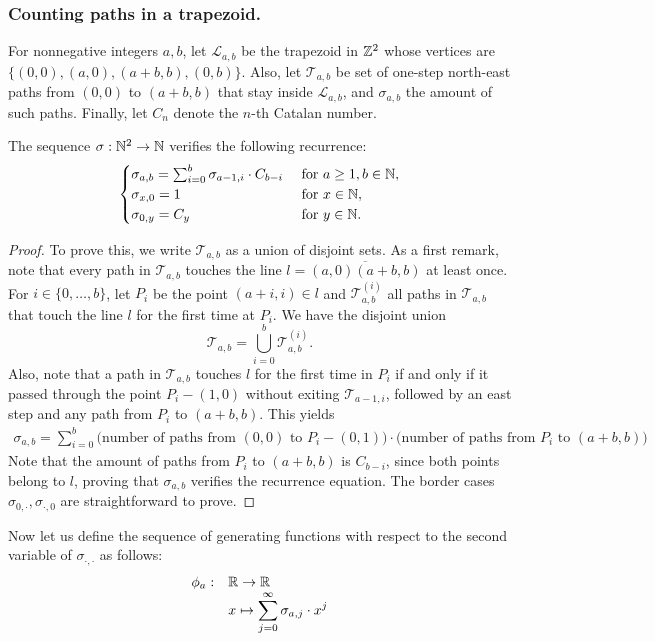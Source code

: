  \subsubsection{Counting paths in a trapezoid.} For nonnegative integers $a,b$, let $\mathcal L_{a,b}$ be the trapezoid in $\mathbb{Z}^2$ whose vertices are
 $\{(0,0),(a,0),(a+b,b),(0,b)\}.$ Also, let $\mathcal{T}_{a,b}$ be set of one-step north-east paths from $(0,0)$ to $(a+b,b)$ that stay inside $\mathcal L_{a,b}$, and  $\sigma_{a,b}$ the amount of such paths. Finally, let $C_n$ denote the $n$-th Catalan number. 
 \begin{myprop}
    \label{sigma-recurrence}
    The sequence $\sigma:\mathbb{N}^2\to \mathbb{N}$ verifies the following recurrence:
    $$\begin{cases}
    \sigma_{a,b}=\sum_{i=0}^b\sigma_{a-1,i}\cdot C_{b-i}& \mbox{ for }a\geq 1,b\in \mathbb{N},\\
    \sigma_{x,0}=1 & \mbox{ for }x\in \mathbb{N},\\
    \sigma_{0,y}=C_y & \mbox{ for }y\in \mathbb{N}.
    \end{cases}$$
 \end{myprop}
 \begin{proof}
    To prove this, we write $\mathcal T_{a,b}$ as a union of disjoint sets. As a first remark, note that every path in $\mathcal T_{a,b}$ touches the line $l=\overline{(a,0)(a+b,b)}$ at least once. For $i\in \{0,\dots,b\}$, let $P_i$ be the point $(a+i,i)\in l$ and $\mathcal T_{a,b}^{(i)}$ all paths in $\mathcal T_{a,b}$ that touch the line $l$ for the first time at $P_i$. We have the disjoint union
    $$\mathcal T_{a,b}=\bigcup_{i=0}^b \mathcal T_{a,b}^{(i)}.$$
    Also, note that a path in $\mathcal T_{a,b}$ touches $l$ for the first time in $P_i$ if and only if it passed through the point $P_i-(1,0)$ without exiting $\mathcal T_{a-1,i}$, followed by an east step and any path from $P_i$ to $(a+b,b)$. This yields
    \begin{eqnarray*}
        \sigma_{a,b}=\sum_{i=0}^{b}\mbox{(number of paths from $(0,0)$ to $P_i-(0,1))$}\cdot \mbox{(number of paths from $P_i$ to $(a+b,b))$}
    \end{eqnarray*}
    Note that the amount of paths from $P_i$ to $(a+b,b)$ is $C_{b-i}$, since both points belong to $l$, proving that $\sigma_{a,b}$ verifies the recurrence equation. The border cases $\sigma_{0,\cdot},\sigma_{\cdot,0}$ are straightforward to prove. 
 \end{proof}
 
 Now let us define the sequence of generating functions with respect to the second variable of $\sigma_{\cdot,\cdot}$ as follows:
 $$\begin{array}{cl}
 \phi_a:&\mathbb{R}\to \mathbb{R}\\
 &x\mapsto \displaystyle \sum_{j=0}^{\infty}\sigma_{a,j}\cdot x^j
 \end{array}$$
 
